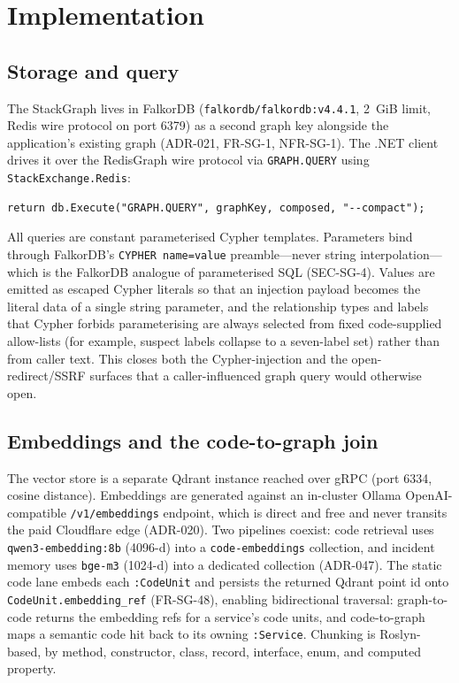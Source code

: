 \documentclass[11pt]{article}
\begin{document}
\section{Implementation}

\subsection{Storage and query}

The StackGraph lives in FalkorDB (\texttt{falkordb/falkordb:v4.4.1}, 2~GiB limit,
Redis wire protocol on port 6379) as a second graph key alongside the
application's existing graph (ADR-021, FR-SG-1, NFR-SG-1). The .NET client drives
it over the RedisGraph wire protocol via \texttt{GRAPH.QUERY} using
\texttt{StackExchange.Redis}:

\begin{verbatim}
return db.Execute("GRAPH.QUERY", graphKey, composed, "--compact");
\end{verbatim}

All queries are constant parameterised Cypher templates. Parameters bind through
FalkorDB's \texttt{CYPHER name=value} preamble---never string interpolation---%
which is the FalkorDB analogue of parameterised SQL (SEC-SG-4). Values are
emitted as escaped Cypher literals so that an injection payload becomes the
literal data of a single string parameter, and the relationship types and labels
that Cypher forbids parameterising are always selected from fixed code-supplied
allow-lists (for example, suspect labels collapse to a seven-label set) rather
than from caller text. This closes both the Cypher-injection and the
open-redirect/SSRF surfaces that a caller-influenced graph query would otherwise
open.

\subsection{Embeddings and the code-to-graph join}

The vector store is a separate Qdrant instance reached over gRPC (port 6334,
cosine distance). Embeddings are generated against an in-cluster Ollama
OpenAI-compatible \texttt{/v1/embeddings} endpoint, which is direct and free and
never transits the paid Cloudflare edge (ADR-020). Two pipelines coexist: code
retrieval uses \texttt{qwen3-embedding:8b} (4096-d) into a
\texttt{code-embeddings} collection, and incident memory uses \texttt{bge-m3}
(1024-d) into a dedicated collection (ADR-047). The static code lane embeds each
\texttt{:CodeUnit} and persists the returned Qdrant point id onto
\texttt{CodeUnit.embedding\_ref} (FR-SG-48), enabling bidirectional traversal:
graph-to-code returns the embedding refs for a service's code units, and
code-to-graph maps a semantic code hit back to its owning \texttt{:Service}.
Chunking is Roslyn-based, by method, constructor, class, record, interface, enum,
and computed property.
\end{document}
